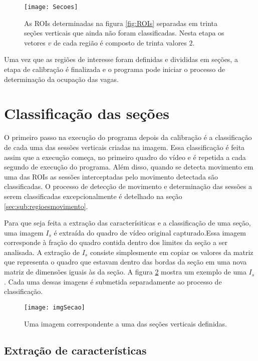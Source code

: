 \begin{figure}
	\centering
	\texttt{[image: Secoes]}
	\label{fig:secoesVerticais}
	\caption{As ROIs determinadas na figura \ref{fig:ROIs} separadas em trinta seções verticais que ainda não foram classificadas. Nesta etapa os vetores $v$ de cada região é composto de trinta valores $2$.}
	\centering
\end{figure}


Uma vez que as regiões de interesse foram definidas e divididas em seções, a etapa de calibração é finalizada e o programa pode iniciar o processo de determinação da ocupação das vagas. 

\section{Classificação das seções} \label{sec:classificacao}

O primeiro passo na execução do programa depois da calibração é a classificação de cada uma das sessões verticais criadas na imagem. Essa classificação é feita assim que a execução começa, no primeiro quadro do vídeo e é repetida a cada segundo de execução do programa. Além disso, quando se detecta movimento em uma das ROIs as sessões interceptadas pelo movimento detectada são classificadas. O processo de detecção de movimento e determinação das sessões a serem classificadas excepcionalmente é detelhado na seção \ref{sec:sub:regioesmovimento}.

Para que seja feita a extração das caracterísiticas e a classificação de uma seção, uma imagem $I_s$ é extraída do quadro de vídeo original capturado.Essa imagem corresponde à fração do quadro contida dentro dos limites da seção a ser analisada. A extração de $I_s$ consiste simplesmente em copiar os valores da matriz que representa o quadro que estavam dentro das bordas da seção em uma nova matriz de dimensões iguais às da seção. A figura \ref{fig:imgSecao} mostra um exemplo de uma $I_s$. Cada uma dessas imagens é submetida separadamente ao processo de classificação.

\begin{figure}
	\centering
	\texttt{[image: imgSecao]}
	\label{fig:imgSecao}
	\caption{Uma imagem correspondente a uma das seções verticais definidas.}
	\centering
\end{figure}


\subsection{Extração de características}\label{sec:extracao}

